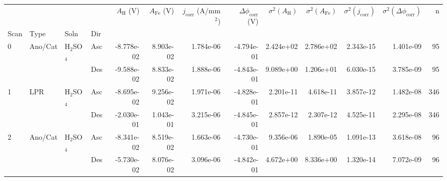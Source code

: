 \begin{tabular}{llllrrrrrrrrr}
\toprule
  &     &     &     &  $A_{\text{H}}$ (V) &  $A_{\text{Fe}}$ (V) &  $j_{\text{corr}}$ (A/mm$^2$) &  $\Delta \phi_{\text{corr}}$ (V) &  $\sigma^2(A_{\text{H}})$ &  $\sigma^2(A_{\text{Fe}})$ &  $\sigma^2(j_{\text{corr}})$ &  $\sigma^2(\Delta \phi_{\text{corr}})$ &    n \\
Scan & Type & Soln & Dir &                     &                      &                               &                                  &                           &                            &                              &                                        &      \\
\midrule
0 & Ano/Cat & H$_2$SO$_4$ & Asc &          -8.778e-02 &            8.903e-02 &                     1.784e-06 &                       -4.794e-01 &                 2.424e+02 &                  2.786e+02 &                    2.343e-15 &                              1.401e-09 &   95 \\
  &     &     & Des &          -9.588e-02 &            8.833e-02 &                     1.888e-06 &                       -4.843e-01 &                 9.089e+00 &                  1.206e+01 &                    6.030e-15 &                              3.785e-09 &   95 \\
1 & LPR & H$_2$SO$_4$ & Asc &          -8.695e-02 &            9.256e-02 &                     1.971e-06 &                       -4.828e-01 &                 2.201e-11 &                  4.618e-11 &                    3.857e-12 &                              1.482e-08 &  346 \\
  &     &     & Des &          -2.030e-01 &            1.043e-01 &                     3.215e-06 &                       -4.845e-01 &                 2.857e-12 &                  2.307e-12 &                    4.525e-11 &                              2.295e-08 &  346 \\
2 & Ano/Cat & H$_2$SO$_4$ & Asc &          -8.341e-02 &            8.519e-02 &                     1.663e-06 &                       -4.730e-01 &                 9.356e-06 &                  1.890e-05 &                    1.091e-13 &                              3.618e-08 &   96 \\
  &     &     & Des &          -5.730e-02 &            8.076e-02 &                     3.096e-06 &                       -4.842e-01 &                 4.672e+00 &                  8.336e+00 &                    1.320e-14 &                              7.072e-09 &   96 \\

\end{tabular}
